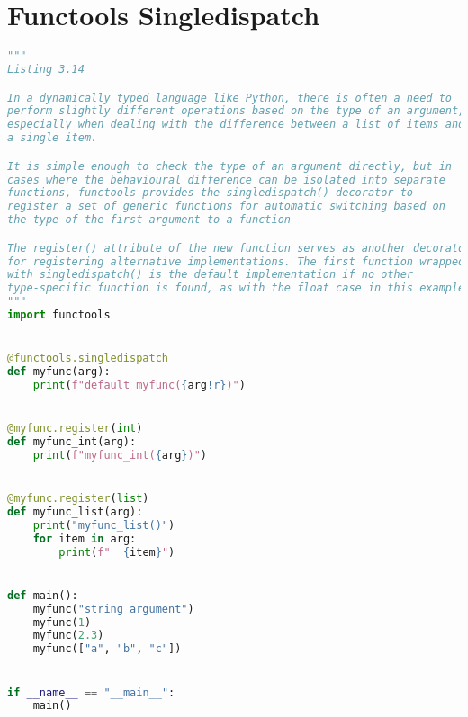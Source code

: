 \documentclass[a4paper,landscape]{report}
\begin{document}
\section{Functools Singledispatch}
\begin{lstlisting}[language=Python]
"""
Listing 3.14

In a dynamically typed language like Python, there is often a need to
perform slightly different operations based on the type of an argument,
especially when dealing with the difference between a list of items and
a single item.

It is simple enough to check the type of an argument directly, but in
cases where the behavioural difference can be isolated into separate
functions, functools provides the singledispatch() decorator to
register a set of generic functions for automatic switching based on
the type of the first argument to a function

The register() attribute of the new function serves as another decorator
for registering alternative implementations. The first function wrapped
with singledispatch() is the default implementation if no other
type-specific function is found, as with the float case in this example.
"""
import functools


@functools.singledispatch
def myfunc(arg):
    print(f"default myfunc({arg!r})")


@myfunc.register(int)
def myfunc_int(arg):
    print(f"myfunc_int({arg})")


@myfunc.register(list)
def myfunc_list(arg):
    print("myfunc_list()")
    for item in arg:
        print(f"  {item}")


def main():
    myfunc("string argument")
    myfunc(1)
    myfunc(2.3)
    myfunc(["a", "b", "c"])


if __name__ == "__main__":
    main()

\end{lstlisting}
\end{document}
